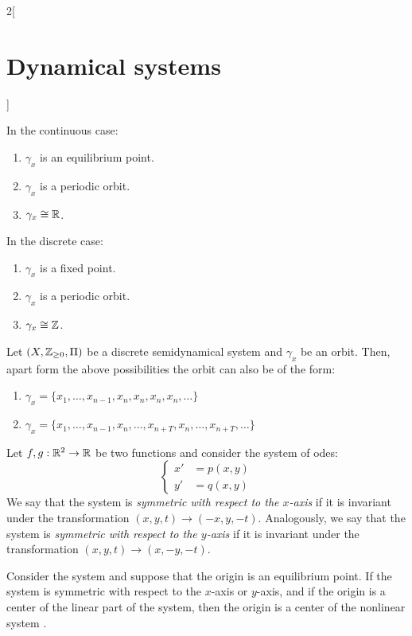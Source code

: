 \documentclass[../../../main_math.tex]{subfiles}
\begin{document}
\begin{multicols}{2}[\section{Dynamical systems}]
\begin{theorem}
    In the continuous case:
    \begin{enumerate}
      \item $\gamma_x$ is an equilibrium point.
      \item $\gamma_x$ is a periodic orbit.
      \item $\gamma_x\cong\mathbb{R}$.
    \end{enumerate}
    In the discrete case:
    \begin{enumerate}
      \item $\gamma_x$ is a fixed point.
      \item $\gamma_x$ is a periodic orbit.
      \item $\gamma_x\cong\mathbb{Z}$.
    \end{enumerate}
  \end{theorem}
  \begin{theorem}
    Let $(X,\mathbb{Z}_{\geq 0},\Pi)$ be a discrete semidynamical system and $\gamma_x$ be an orbit. Then, apart form the above possibilities the orbit can also be of the form:
    \begin{enumerate}
      \item $\gamma_x=\{x_1,\ldots,x_{n-1},x_n,x_n,x_n,x_n,\ldots\}$
      \item $\gamma_x=\{x_1,\ldots,x_{n-1},x_n,\ldots,x_{n+T},x_n,\ldots,x_{n+T},\ldots\}$
    \end{enumerate}
  \end{theorem}
  \begin{definition}
    Let $f,g:\mathbb{R}^2\rightarrow\mathbb{R}$ be two functions and consider the system of odes:
    \begin{equation}\label{DS:plane}
      \left\{
      \begin{aligned}
        x' & =p(x,y) \\
        y' & =q(x,y)
      \end{aligned}
      \right.
    \end{equation}
    We say that the system is \emph{symmetric with respect to the $x$-axis} if it is invariant under the transformation $(x,y,t)\rightarrow(-x,y,-t)$. Analogously, we say that the system is \emph{symmetric with respect to the $y$-axis} if it is invariant under the transformation $(x,y,t)\rightarrow(x,-y,-t)$.
  \end{definition}
  \begin{theorem}
    Consider the system  and suppose that the origin is an equilibrium point. If the system is symmetric with respect to the $x$-axis or $y$-axis, and if the origin is a center of the linear part of the system, then the origin is a center of the nonlinear system .

\end{theorem}
\end{multicols}
\end{document}
